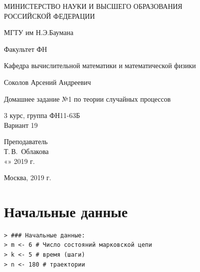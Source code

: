 \documentclass[14pt,a4paper]{scrartcl}
\begin{document}
	\begin{titlepage}
	\begin{center}
		\large
		МИНИСТЕРСТВО НАУКИ И ВЫСШЕГО ОБРАЗОВАНИЯ\\ РОССИЙСКОЙ ФЕДЕРАЦИИ
		
		\vspace{0.5cm}
		
		МГТУ им Н.Э.Баумана
		\vspace{0.25cm}
		
		Факультет ФН
		
		Кафедра вычислительной математики и математической физики
		\vfill
		
		
		Соколов Арсений Андреевич\\
		\vfill
		
		
		{\LARGE Домашнее задание №1 по теории случайных процессов\\[2mm]
		}
		\bigskip
		
		3 курс, группа ФН11-63Б\\
		Вариант 19
	\end{center}
	\vfill
	
	\newlength{\ML}
	\hfill\begin{minipage}{0.4\textwidth}
		Преподаватель\\
		\underline{\hspace{3cm}} Т.\,В.~Облакова\\
		«\underline{\hspace{0.7cm}}» \underline{\hspace{1.71cm}} 2019 г.
	\end{minipage}%
	\bigskip
	
	
	\vfill
	
	\begin{center}
		Москва, 2019 г.
	\end{center}
\end{titlepage}

\section*{Начальные данные}

\begin{verbatim}
> ### Начальные данные:
> m <- 6 # Число состояний марковской цепи
> k <- 5 # время (шаги)
> n <- 180 # траектории
\end{verbatim}
\end{document}
